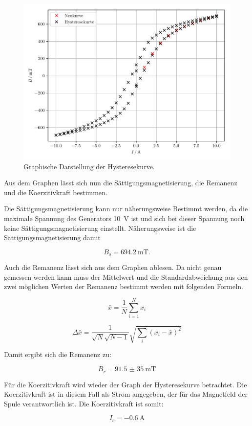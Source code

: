 \begin{figure}[H]
  \centering
  \includegraphics{plot6.pdf}
  \caption{Graphische Darstellung der Hysteresekurve.}
  \label{abb:12}
\end{figure}

Aus dem Graphen lässt sich nun die Sättigungsmagnetisierung, die Remanenz und die
Koerzitivkraft bestimmen.

Die Sättigungsmagnetisierung kann nur näherungsweise Bestimmt werden, da die
maximale Spannung des Generators \SI{10}{\volt} ist und sich bei dieser Spannung noch
keine Sättigungsmagnetisierung einstellt. Näherungsweise ist die Sättigungsmagnetisierung
damit

\begin{equation*}
  B_s = \SI{694.2}{\milli\tesla}.
\end{equation*}

Auch die Remanenz lässt sich aus dem Graphen ablesen. Da nicht genau gemessen werden
kann muss der Mittelwert und die Standardabweichung aus den zwei möglichen Werten der Remanenz bestimmt werden
mit folgenden Formeln.

\begin{equation}
    \bar{x} = \frac{1}{N} \sum_{i=1}^{N} x_i
\end{equation}

\begin{equation}
  \Delta \bar{x} = \frac{1}{\sqrt{N}\sqrt{N-1}} \sqrt{\sum_{i}(x_i-\bar{x})^2}
\end{equation}

Damit ergibt sich die Remanenz zu:

\begin{equation*}
  B_r = \SI{91.5(350)}{\milli\tesla}
\end{equation*}

Für die Koerzitivkraft wird wieder der Graph der Hysteresekurve betrachtet. Die
Koerzitivkraft ist in diesem Fall als Strom angegeben, der für das Magnetfeld der
Spule verantwortlich ist. Die Koerzitivkraft ist somit:

\begin{equation*}
  I_c = \SI{-0.6}{\ampere}
\end{equation*}
